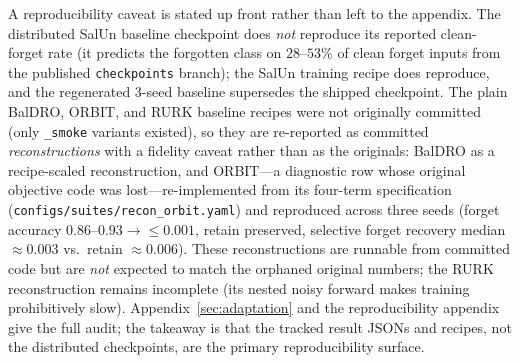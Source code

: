 \documentclass{article}
\begin{document}
A reproducibility caveat is stated up front rather than left to the appendix. The distributed SalUn baseline checkpoint does \emph{not} reproduce its reported clean-forget rate (it predicts the forgotten class on $28$--$53\%$ of clean forget inputs from the published \texttt{checkpoints} branch); the SalUn training recipe does reproduce, and the regenerated 3-seed baseline supersedes the shipped checkpoint. The plain BalDRO, ORBIT, and RURK baseline recipes were not originally committed (only \texttt{\_smoke} variants existed), so they are re-reported as committed \emph{reconstructions} with a fidelity caveat rather than as the originals: BalDRO as a recipe-scaled reconstruction, and ORBIT---a diagnostic row whose original objective code was lost---re-implemented from its four-term specification (\texttt{configs/suites/recon\_orbit.yaml}) and reproduced across three seeds (forget accuracy $0.86$--$0.93\!\to\!\le\!0.001$, retain preserved, selective forget recovery median $\approx\!0.003$ vs.\ retain $\approx\!0.006$). These reconstructions are runnable from committed code but are \emph{not} expected to match the orphaned original numbers; the RURK reconstruction remains incomplete (its nested noisy forward makes training prohibitively slow). Appendix~\ref{sec:adaptation} and the reproducibility appendix give the full audit; the takeaway is that the tracked result JSONs and recipes, not the distributed checkpoints, are the primary reproducibility surface.
\end{document}
